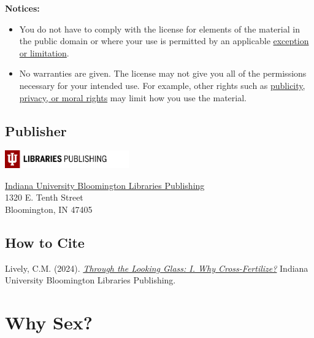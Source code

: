 \documentclass[
  letterpaper,
]{book}
\providecommand{\tightlist}{%
  \setlength{\itemsep}{0pt}\setlength{\parskip}{0pt}}\usepackage{longtable,booktabs,array}
\begin{document}
\textbf{Notices:}

\begin{itemize}
\tightlist
\item
  You do not have to comply with the license for elements of the
  material in the public domain or where your use is permitted by an
  applicable
  \href{https://creativecommons.org/licenses/by/4.0/\#ref-exception-or-limitation}{exception
  or limitation}.\\
\item
  No warranties are given. The license may not give you all of the
  permissions necessary for your intended use. For example, other rights
  such as
  \href{https://creativecommons.org/licenses/by/4.0/\#ref-publicity-privacy-or-moral-rights}{publicity,
  privacy, or moral rights} may limit how you use the material.
\end{itemize}

\section*{Publisher}\label{publisher}


\includegraphics[width=0.4\textwidth,height=\textheight]{images/iublpub_logo.png}

\href{https://libraries.indiana.edu/scholarly-communication}{Indiana
University Bloomington Libraries Publishing}\\
1320 E. Tenth Street\\
Bloomington, IN 47405

\section*{How to Cite}\label{how-to-cite}


Lively, C.M. (2024).
\href{https://doi.org/10.5967/GBD3-KA07}{\emph{Through the Looking
Glass: I. Why Cross-Fertilize?}} Indiana University Bloomington
Libraries Publishing.


\chapter{Why Sex?}\label{sec-why-sex}
\end{document}
